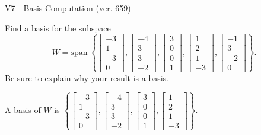 \begin{exercise}
  \begin{exerciseTitle}V7 - Basis Computation (ver. 659)\end{exerciseTitle}
  \begin{exerciseStatement}
    Find a basis for the subspace 
\[W=\mathrm{span}\ \left\{\left[\begin{array}{r}
-3 \\
1 \\
-3 \\
0
\end{array}\right] , \left[\begin{array}{r}
-4 \\
3 \\
3 \\
-2
\end{array}\right] , \left[\begin{array}{r}
3 \\
0 \\
0 \\
1
\end{array}\right] , \left[\begin{array}{r}
1 \\
2 \\
1 \\
-3
\end{array}\right] , \left[\begin{array}{r}
-1 \\
3 \\
-2 \\
0
\end{array}\right]\right\}.\]
 Be sure to explain why your result is a basis.


  \end{exerciseStatement}
  \begin{exerciseAnswer}
   A basis of \(W\) is  \(\left\{\left[\begin{array}{r}
-3 \\
1 \\
-3 \\
0
\end{array}\right] , \left[\begin{array}{r}
-4 \\
3 \\
3 \\
-2
\end{array}\right] , \left[\begin{array}{r}
3 \\
0 \\
0 \\
1
\end{array}\right] , \left[\begin{array}{r}
1 \\
2 \\
1 \\
-3
\end{array}\right]\right\}\).
  


  \end{exerciseAnswer}
\end{exercise}